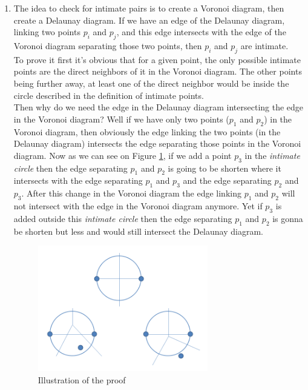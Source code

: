 \begin{enumerate}
	\item The idea to check for intimate pairs is to create a Voronoi diagram, then create a Delaunay diagram. If we have an edge of the Delaunay diagram, linking two points $p_i$ and $p_j$, and this edge intersects with the edge of the Voronoi diagram separating those two points, then $p_i$ and $p_j$ are intimate.\\
To prove it first it's obvious that for a given point, the only possible intimate points are the direct neighbors of it in the Voronoi diagram. The other points being further away, at least one of the direct neighbor would be inside the circle described in the definition of intimate points.\\
Then why do we need the edge in the Delaunay diagram intersecting the edge in the Voronoi diagram? Well if we have only two points ($p_1$ and $p_2$) in the Voronoi diagram, then obviously the edge linking the two points (in the Delaunay diagram) intersects the edge separating those points in the Voronoi diagram. Now as we can see on Figure \ref{fig:q11}, if we add a point $p_3$ in the \textit{intimate circle} then the edge separating $p_1$ and $p_2$ is going to be shorten where it intersects with the edge separating $p_1$ and $p_3$ and the edge separating $p_2$ and $p_3$. After this change in the Voronoi diagram the edge linking $p_1$ and $p_2$ will not intersect with the edge in the Voronoi diagram anymore. Yet if $p_3$ is added outside this \textit{intimate circle} then the edge separating $p_1$ and $p_2$ is gonna be shorten but less and would still intersect the Delaunay diagram.
\begin{figure}[ht]
  \centering
\includegraphics[width=0.7\textwidth]{q11}%
\caption{Illustration of the proof}%
\label{fig:q11}%
\end{figure}
\clearpage

\end{enumerate}

